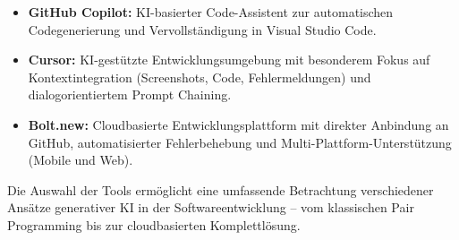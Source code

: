\begin{itemize}
    \item \textbf{GitHub Copilot:} KI-basierter Code-Assistent zur automatischen Codegenerierung und Vervollständigung in Visual Studio Code.
    \item \textbf{Cursor:} KI-gestützte Entwicklungsumgebung mit besonderem Fokus auf Kontextintegration (Screenshots, Code, Fehlermeldungen) und dialogorientiertem Prompt Chaining.
    \item \textbf{Bolt.new:} Cloudbasierte Entwicklungsplattform mit direkter Anbindung an GitHub, automatisierter Fehlerbehebung und Multi-Plattform-Unterstützung (Mobile und Web).
\end{itemize}

Die Auswahl der Tools ermöglicht eine umfassende Betrachtung verschiedener
Ansätze generativer KI in der Softwareentwicklung – vom klassischen Pair
Programming bis zur cloudbasierten Komplettlösung.

